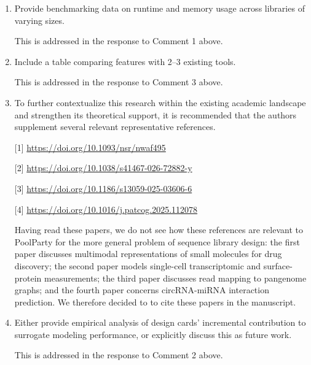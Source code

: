 \documentclass[11pt]{article}
\newenvironment{response}{\par\color{responseblue}}{\par}
\begin{document}
\begin{enumerate}
\begin{response}
Tables S2 and S3 in the new Supplemental Information document provide a systematic comparison between PoolParty and other competing tools. Figs.~S3 and S4 further provide code comparisons between PoolParty and the two competing packages, VaLiAnT and tangermeme, in two specific use caes. As mentioned above, we additionally tried to provide a comparison to MPRAnator, but that software (which runs through a web interface) is no longer functional. The Introductiona nd Discussion have also been revised to more explicitly compare PoolParty to existing tools. 
\end{response}

\item Provide benchmarking data on runtime and memory usage across libraries of
varying sizes.

\begin{response}
This is addressed in the response to Comment 1 above. 
\end{response}

\item Include a table comparing features with 2--3 existing tools.

\begin{response}
This is addressed in the response to Comment 3 above. 
\end{response}

\item To further contextualize this research within the existing academic
landscape and strengthen its theoretical support, it is recommended that the
authors supplement several relevant representative references.

[1] \url{https://doi.org/10.1093/nsr/nwaf495}

[2] \url{https://doi.org/10.1038/s41467-026-72882-y}

[3] \url{https://doi.org/10.1186/s13059-025-03606-6}

[4] \url{https://doi.org/10.1016/j.patcog.2025.112078}

\begin{response}
Having read these papers, we do not see how these references are relevant to PoolParty for the more general problem of sequence library design: the first paper discusses multimodal representations of small molecules for drug discovery; the second paper models single-cell transcriptomic and surface-protein measurements; the third paper discusses read mapping to pangenome graphs; and the fourth paper concerns circRNA-miRNA interaction prediction. We therefore decided to to cite these papers in the manuscript. 
\end{response}

\item Either provide empirical analysis of design cards' incremental
contribution to surrogate modeling performance, or explicitly discuss this as
future work.

\begin{response}
This is addressed in the response to Comment 2 above. 
\end{response}
\end{enumerate}
\end{document}

